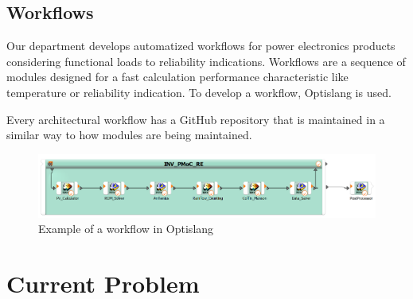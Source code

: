 \subsection{Workflows}
Our department develops automatized workflows for power electronics products considering functional loads to reliability indications. Workflows are a sequence
of modules designed for a fast calculation performance characteristic like temperature or reliability indication. To develop a workflow, Optislang is used.


Every architectural workflow has a GitHub repository that is maintained in a similar way to how modules are being maintained.

\begin{figure}[!h]
    \centering
    \includegraphics[width=\textwidth]{Images/workflow_example.png}
    \caption{Example of a workflow in Optislang}
    \label{workflow_example}
\end{figure}

\section{Current Problem} \label{current problem}

